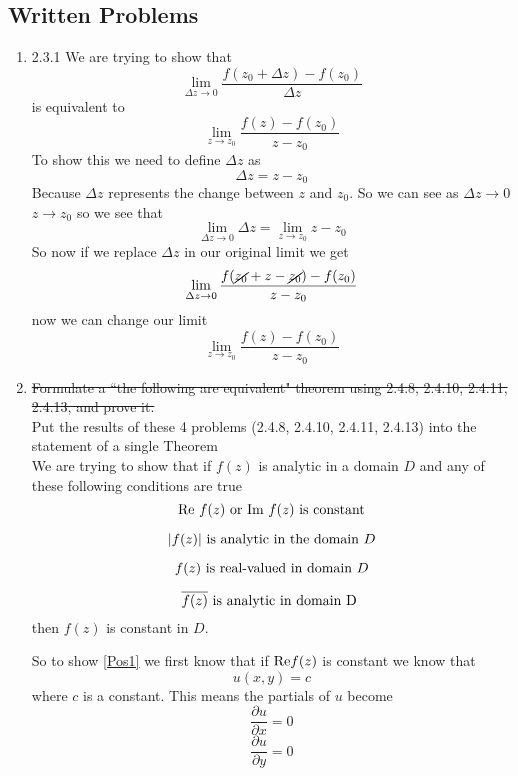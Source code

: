\documentclass[11pt]{article}
\begin{document}

\subsection*{Written Problems}
\begin{enumerate}
\item  2.3.1
We are trying to show that 
$$\lim_{\Delta z\rightarrow 0}\frac{f(z_0 + \Delta z) - f(z_0)}{\Delta z}$$
is equivalent to 
$$\lim_{z\rightarrow z_0}\frac{f(z) - f(z_0)}{z-z_0}$$
To show this we need to define $\Delta z$ as
$$\Delta z = z - z_0$$
Because $\Delta z$ represents the change between $z$ and $z_0$. So we can see as $\Delta z \rightarrow 0$ $z\rightarrow z_0$ so we see that
$$\lim_{\Delta z\rightarrow 0}\Delta z = \lim_{z\rightarrow z_0} z - z_0$$
So now if we replace $\Delta z$ in our original limit we get
$$\lim_{\Delta z\rightarrow 0}\frac{f(\cancel{z_0} + z - \cancel{z_0}) - f(z_0)}{z-z_0}$$
now we can change our limit
$$\lim_{z\rightarrow z_0}\frac{f(z) - f(z_0)}{z-z_0}$$


\item  \sout{Formulate a ``the following are equivalent" theorem using 2.4.8, 2.4.10, 2.4.11, 2.4.13, and prove it.} \\
Put the results of these 4 problems (2.4.8, 2.4.10, 2.4.11, 2.4.13) into the statement of a single Theorem\\
We are trying to show that if $f(z)$ is analytic in a domain $D$ and any of these following conditions are true
\begin{equation}
\textnormal{Re}\ f(z)\ \textnormal{or } \textnormal{Im}\ f(z)\ \textnormal{is constant}
\label{Pos1}
\end{equation}

\begin{equation}
|f(z)| \textnormal{ is analytic in the domain } D
\label{Pos2}
\end{equation}

\begin{equation}
f(z) \textnormal{ is real-valued in domain } D
\label{Pos3}
\end{equation}

\begin{equation}
\overline{f(z)} \textnormal{ is analytic in domain D }
\label{Pos4}
\end{equation}
then $f(z)$ is constant in $D$. 

So to show \ref{Pos1} we first know that if $\textnormal{Re}f(z)$ is constant we know that
$$u(x,y) = c$$
where $c$ is a constant. This means the partials of $u$ become
$$\frac{\partial u}{\partial x}=0$$
$$\frac{\partial u}{\partial y}=0$$


\end{enumerate}
\end{document}
